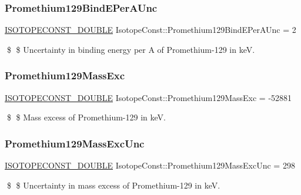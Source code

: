\subsubsection{\texorpdfstring{Promethium129\+Bind\+E\+Per\+A\+Unc}{Promethium129BindEPerAUnc}}
{\footnotesize\ttfamily \mbox{\hyperlink{group___isotope_const-_macros_ga8f45a7272ce02c0b4c65c44636ed719a}{I\+S\+O\+T\+O\+P\+E\+C\+O\+N\+S\+T\+\_\+\+D\+O\+U\+B\+LE}} Isotope\+Const\+::\+Promethium129\+Bind\+E\+Per\+A\+Unc = 2}

\$ \$ Uncertainty in binding energy per A of Promethium-\/129 in keV. \mbox{\label{group___isotope_const-_promethium-_pm129_ga5f2018029dcad65f998a7761cab1d577}} 
\subsubsection{\texorpdfstring{Promethium129\+Mass\+Exc}{Promethium129MassExc}}
{\footnotesize\ttfamily \mbox{\hyperlink{group___isotope_const-_macros_ga8f45a7272ce02c0b4c65c44636ed719a}{I\+S\+O\+T\+O\+P\+E\+C\+O\+N\+S\+T\+\_\+\+D\+O\+U\+B\+LE}} Isotope\+Const\+::\+Promethium129\+Mass\+Exc = -\/52881}

\$ \$ Mass excess of Promethium-\/129 in keV. \mbox{\label{group___isotope_const-_promethium-_pm129_gafdf040002b44e2531a6f3cc11641ac07}} 
\subsubsection{\texorpdfstring{Promethium129\+Mass\+Exc\+Unc}{Promethium129MassExcUnc}}
{\footnotesize\ttfamily \mbox{\hyperlink{group___isotope_const-_macros_ga8f45a7272ce02c0b4c65c44636ed719a}{I\+S\+O\+T\+O\+P\+E\+C\+O\+N\+S\+T\+\_\+\+D\+O\+U\+B\+LE}} Isotope\+Const\+::\+Promethium129\+Mass\+Exc\+Unc = 298}

\$ \$ Uncertainty in mass excess of Promethium-\/129 in keV. \mbox{\label{group___isotope_const-_promethium-_pm129_gaf9038bb2ab124e2f2e5a961e03eb82f2}} 

